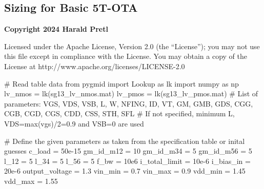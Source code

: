 \documentclass[
  a4paper,
  DIV=11,
  numbers=noendperiod]{scrartcl}
\newenvironment{Shaded}{\begin{snugshade}}{\end{snugshade}}
\newcommand{\CommentTok}[1]{\textcolor[rgb]{0.37,0.37,0.37}{#1}}
\newcommand{\DecValTok}[1]{\textcolor[rgb]{0.68,0.00,0.00}{#1}}
\newcommand{\FloatTok}[1]{\textcolor[rgb]{0.68,0.00,0.00}{#1}}
\newcommand{\ImportTok}[1]{\textcolor[rgb]{0.00,0.46,0.62}{#1}}
\newcommand{\NormalTok}[1]{\textcolor[rgb]{0.00,0.23,0.31}{#1}}
\newcommand{\OperatorTok}[1]{\textcolor[rgb]{0.37,0.37,0.37}{#1}}
\newcommand{\StringTok}[1]{\textcolor[rgb]{0.13,0.47,0.30}{#1}}
\begin{document}
\begin{tcolorbox}[enhanced jigsaw, breakable, title=\textcolor{quarto-callout-tip-color}{\faLightbulb}\hspace{0.5em}{Solution: 5T-OTA Sizing}, left=2mm, bottomrule=.15mm, opacitybacktitle=0.6, opacityback=0, colframe=quarto-callout-tip-color-frame, leftrule=.75mm, bottomtitle=1mm, colbacktitle=quarto-callout-tip-color!10!white, toprule=.15mm, rightrule=.15mm, toptitle=1mm, titlerule=0mm, arc=.35mm, colback=white, coltitle=black]

\section{Sizing for Basic 5T-OTA}\label{sizing-for-basic-5t-ota}

\textbf{Copyright 2024 Harald Pretl}

Licensed under the Apache License, Version 2.0 (the ``License''); you
may not use this file except in compliance with the License. You may
obtain a copy of the License at
http://www.apache.org/licenses/LICENSE-2.0

\begin{Shaded}
\begin{Highlighting}[]
\CommentTok{\# Read table data}
\ImportTok{from}\NormalTok{ pygmid }\ImportTok{import}\NormalTok{ Lookup }\ImportTok{as}\NormalTok{ lk}
\ImportTok{import}\NormalTok{ numpy }\ImportTok{as}\NormalTok{ np}
\NormalTok{lv\_nmos }\OperatorTok{=}\NormalTok{ lk(}\StringTok{\textquotesingle{}sg13\_lv\_nmos.mat\textquotesingle{}}\NormalTok{)}
\NormalTok{lv\_pmos }\OperatorTok{=}\NormalTok{ lk(}\StringTok{\textquotesingle{}sg13\_lv\_pmos.mat\textquotesingle{}}\NormalTok{)}
\CommentTok{\# List of parameters: VGS, VDS, VSB, L, W, NFING, ID, VT, GM, GMB, GDS, CGG, CGB, CGD, CGS, CDD, CSS, STH, SFL}
\CommentTok{\# If not specified, minimum L, VDS=max(vgs)/2=0.9 and VSB=0 are used }
\end{Highlighting}
\end{Shaded}

\begin{Shaded}
\begin{Highlighting}[]
\CommentTok{\# Define the given parameters as taken from the specification table or inital guesses}
\NormalTok{c\_load }\OperatorTok{=} \FloatTok{50e{-}15}
\NormalTok{gm\_id\_m12 }\OperatorTok{=} \DecValTok{10}
\NormalTok{gm\_id\_m34 }\OperatorTok{=} \DecValTok{5}
\NormalTok{gm\_id\_m56 }\OperatorTok{=} \DecValTok{5}
\NormalTok{l\_12 }\OperatorTok{=} \DecValTok{5}
\NormalTok{l\_34 }\OperatorTok{=} \DecValTok{5}
\NormalTok{l\_56 }\OperatorTok{=} \DecValTok{5}
\NormalTok{f\_bw }\OperatorTok{=} \FloatTok{10e6}
\NormalTok{i\_total\_limit }\OperatorTok{=} \FloatTok{10e{-}6}
\NormalTok{i\_bias\_in }\OperatorTok{=} \FloatTok{20e{-}6}
\NormalTok{output\_voltage }\OperatorTok{=} \FloatTok{1.3}
\NormalTok{vin\_min }\OperatorTok{=} \FloatTok{0.7}
\NormalTok{vin\_max }\OperatorTok{=} \FloatTok{0.9}
\NormalTok{vdd\_min }\OperatorTok{=} \FloatTok{1.45}
\NormalTok{vdd\_max }\OperatorTok{=} \FloatTok{1.55}
\end{Highlighting}
\end{Shaded}


\end{tcolorbox}
\end{document}
